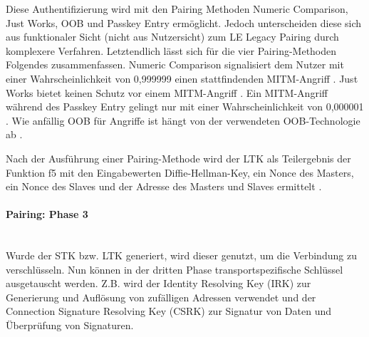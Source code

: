 Diese Authentifizierung wird mit den Pairing Methoden Numeric Comparison, Just Works, OOB und Passkey Entry ermöglicht. Jedoch unterscheiden diese sich aus funktionaler Sicht (nicht aus Nutzersicht) zum LE Legacy Pairing durch komplexere Verfahren. Letztendlich lässt sich für die vier Pairing-Methoden Folgendes zusammenfassen. Numeric Comparison signalisiert dem Nutzer mit einer Wahrscheinlichkeit von 0,999999 einen stattfindenden MITM-Angriff \cite{BtSpec4.2_2309}. 
Just Works bietet keinen Schutz vor einem MITM-Angriff \cite{BtSpec4.2_245}. 
Ein MITM-Angriff während des Passkey Entry gelingt nur mit einer Wahrscheinlichkeit von 0,000001 \cite{BtSpec4.2_2311}. 
Wie anfällig OOB für Angriffe ist hängt von der verwendeten OOB-Technologie ab \cite{BtSpec4.2_2312-2313}.

Nach der Ausführung einer Pairing-Methode wird der LTK als Teilergebnis der Funktion f5 \cite{BtSpec4.2_2292-2293} 
mit den Eingabewerten Diffie-Hellman-Key, ein Nonce des Masters, ein Nonce des Slaves und der Adresse des Masters und Slaves ermittelt \cite{BtSpec4.2_2314}.

\paragraph{Pairing: Phase 3} \mbox{} \vspace{0.2cm} \\
Wurde der STK bzw. LTK generiert, wird dieser genutzt, um die Verbindung zu verschlüsseln. Nun können in der dritten Phase transportspezifische Schlüssel ausgetauscht werden. Z.B. wird der Identity Resolving Key (IRK) zur Generierung und Auflösung von zufälligen Adressen verwendet und der Connection Signature Resolving Key (CSRK) zur Signatur von Daten und Überprüfung von Signaturen.



